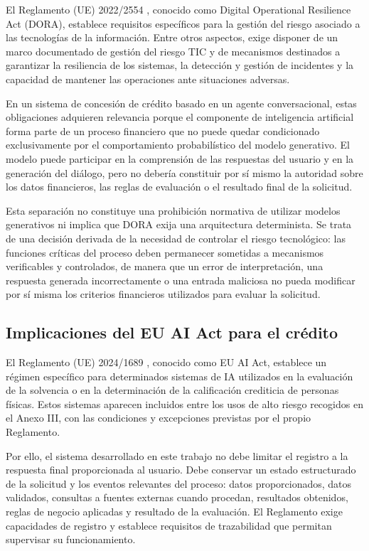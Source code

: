 \documentclass[12pt,a4paper]{report}
\begin{document}
El Reglamento (UE) 2022/2554 \cite{dora2022}, conocido como Digital Operational Resilience Act (DORA), establece requisitos específicos para la gestión del riesgo asociado a las tecnologías de la información. Entre otros aspectos, exige disponer de un marco documentado de gestión del riesgo TIC y de mecanismos destinados a garantizar la resiliencia de los sistemas, la detección y gestión de incidentes y la capacidad de mantener las operaciones ante situaciones adversas.

En un sistema de concesión de crédito basado en un agente conversacional, estas obligaciones adquieren relevancia porque el componente de inteligencia artificial forma parte de un proceso financiero que no puede quedar condicionado exclusivamente por el comportamiento probabilístico del modelo generativo. El modelo puede participar en la comprensión de las respuestas del usuario y en la generación del diálogo, pero no debería constituir por sí mismo la autoridad sobre los datos financieros, las reglas de evaluación o el resultado final de la solicitud.

Esta separación no constituye una prohibición normativa de utilizar modelos generativos ni implica que DORA exija una arquitectura determinista. Se trata de una decisión derivada de la necesidad de controlar el riesgo tecnológico: las funciones críticas del proceso deben permanecer sometidas a mecanismos verificables y controlados, de manera que un error de interpretación, una respuesta generada incorrectamente o una entrada maliciosa no pueda modificar por sí misma los criterios financieros utilizados para evaluar la solicitud.

\subsection{Implicaciones del EU AI Act para el crédito}

El Reglamento (UE) 2024/1689 \cite{euaiAct2024}, conocido como EU AI Act, establece un régimen específico para determinados sistemas de IA utilizados en la evaluación de la solvencia o en la determinación de la calificación crediticia de personas físicas. Estos sistemas aparecen incluidos entre los usos de alto riesgo recogidos en el Anexo III, con las condiciones y excepciones previstas por el propio Reglamento.

Por ello, el sistema desarrollado en este trabajo no debe limitar el registro a la respuesta final proporcionada al usuario. Debe conservar un estado estructurado de la solicitud y los eventos relevantes del proceso: datos proporcionados, datos validados, consultas a fuentes externas cuando procedan, resultados obtenidos, reglas de negocio aplicadas y resultado de la evaluación. El Reglamento exige capacidades de registro y establece requisitos de trazabilidad que permitan supervisar su funcionamiento.
\end{document}
